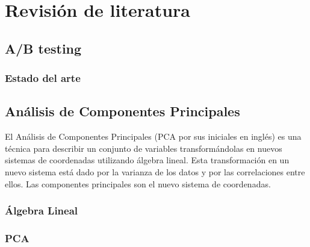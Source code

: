 \chapter{Revisión de literatura}

\noindent   

\newpage

\section{A/B testing}

\subsection{Estado del arte}

\section{Análisis de Componentes Principales}
\noindent El Análisis de Componentes Principales (PCA por sus iniciales en inglés) es una técnica para describir un conjunto de variables transformándolas en nuevos sistemas de coordenadas utilizando álgebra lineal. Esta transformación en un nuevo sistema está dado por la varianza de los datos y por las correlaciones entre ellos. Las componentes principales son el nuevo sistema de coordenadas.
\subsection{Álgebra Lineal}
\subsection{PCA}





